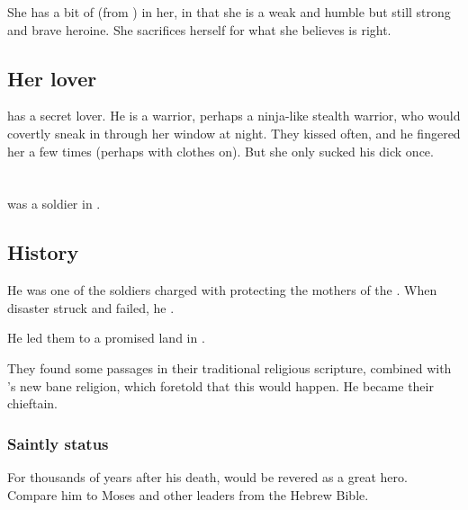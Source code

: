 She has a bit of \PhedreNoDelaunay{} (from ) in her, in that she is a weak and humble but still strong and brave heroine. 
She sacrifices herself for what she believes is right. 









\subsection{Her lover}
\Ilu{} has a secret lover. He is a warrior, perhaps a ninja-like stealth warrior, who would covertly sneak in through her window at night. They kissed often, and he fingered her a few times (perhaps with clothes on). But she only sucked his dick once. 















\section{\Morza}
\index{\Morza}
\Morza was a \nephil soldier in .









\subsection{History}
He was one of the soldiers charged with protecting the mothers of the \resphain.
When disaster struck and \Thanatzil failed, he .

He led them to a promised land in \Nyx.

They found some passages in their traditional religious scripture, combined with \Semiza's new bane religion, which foretold that this would happen.
He became their chieftain.





\subsubsection{Saintly status}
For thousands of years after his death, \Morza would be revered as a great hero.
Compare him to Moses and other leaders from the Hebrew Bible.









